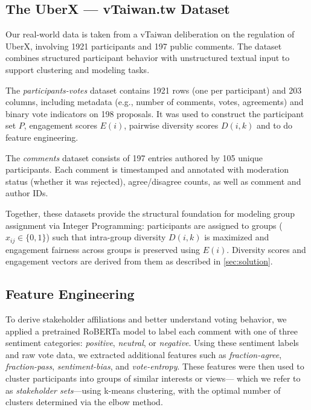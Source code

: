 \subsection*{The UberX — vTaiwan.tw Dataset}

Our real-world data is taken from a vTaiwan deliberation on the regulation of UberX,
involving 1921 participants and 197 public comments.
The dataset combines structured participant behavior
with unstructured textual input to support clustering and modeling tasks.

The \emph{participants-votes} dataset contains 1921 rows (one per participant) and 203 columns,
including metadata (e.g., number of comments, votes, agreements)
and binary vote indicators on 198 proposals.
It was used to construct the participant set \(P\), engagement scores \(E(i)\),
pairwise diversity scores \(D(i,k)\) and to do feature engineering.

The \emph{comments} dataset consists of 197 entries authored by 105 unique participants.
Each comment is timestamped and annotated with moderation status
(whether it was rejected), agree/disagree counts, as well as comment and author IDs.

Together, these datasets provide the structural foundation for modeling group assignment via Integer Programming:
participants are assigned to groups (\(x_{ij} \in \{0,1\}\))
such that intra-group diversity \(D(i,k)\) is maximized
and engagement fairness across groups is preserved using \(E(i)\).
Diversity scores and engagement vectors are derived from them as described in \cref{sec:solution}.

\subsection*{Feature Engineering}

To derive stakeholder affiliations and better understand voting behavior,
we applied a pretrained RoBERTa model to label each comment with one of three sentiment categories:
\emph{positive}, \emph{neutral}, or \emph{negative}.
Using these sentiment labels and raw vote data,
we extracted additional features such as \emph{fraction-agree}, \emph{fraction-pass},
\emph{sentiment-bias}, and \emph{vote-entropy}.
These features were then used to cluster participants into groups of similar interests or views—
which we refer to as \emph{stakeholder sets}—using k-means clustering,
with the optimal number of clusters determined via the elbow method.